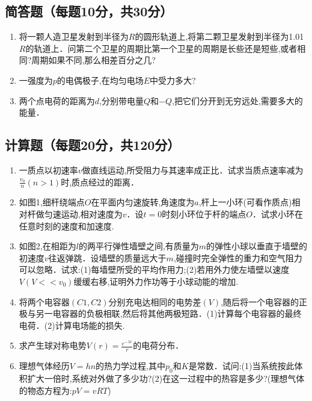 
\subsection{ 简答题（每题10分，共30分）}
\begin{enumerate}
\item 将一颗人造卫星发射到半径为$R$的圆形轨道上,将第二颗卫星发射到半径为1.01$R$的轨道上．问第二个卫星的周期比第一个卫星的周期是长些还是短些,或者相同?周期如果不同,那么相差百分之几?
\item 一强度为$p$的电偶极子,在均匀电场$E$中受力多大?
\item 两个点电荷的距离为$d$,分别带电量$Q$和$-Q$,把它们分开到无穷远处,需要多大的能量．
\end{enumerate}
\subsection{计算题（每题20分，共120分）}
\begin{enumerate}
\item 一质点以初速率$v$做直线运动,所受阻力与其速率成正比．试求当质点速率减为$\frac{v_0}{n}(n>1)$时,质点经过的距离．
\item 如图1,细杆绕端点$O$在平面内匀速旋转,角速度为$a$,杆上一小环(可看作质点)相对杆做匀速运动,相对速度为$v$．设$t=0$时刻小环位于杆的端点$O$．试求小环在任意时刻的速度和加速度.
\item 如图2,在相距为$l$的两平行弹性墙壁之间,有质量为$m$的弹性小球以垂直于墙壁的初速度$v$往返弹跳．设墙壁的质量远大于$m$,碰撞时完全弹性的重力和空气阻力可以忽略．试求:(1)每墙壁所受的平均作用力;(2)若用外力使左墙壁以速度$V(V<<v_0)$缓缓右移,证明外力作功等于小球动能的增加.
\item 将两个电容器$(C1,C2)$分别充电达相同的电势差$(V)$,随后将一个电容器的正极与另一电容器的负极相联,然后将其他两极短路．(1)计算每个电容器的最终电荷．(2)计算电场能的损失.
\item 求产生球对称电势$V(r)=\frac{e^{-\lambda r}}{r}$的电荷分布．
\item 理想气体经历$V=hn$的热力学过程,其中$p_0$和$K$是常数．试问:(1)当系统按此体积扩大一倍时,系统对外做了多少功?(2)在这一过程中的热容是多少?(理想气体的物态方程为:$pV=vRT$)
\end{enumerate}
